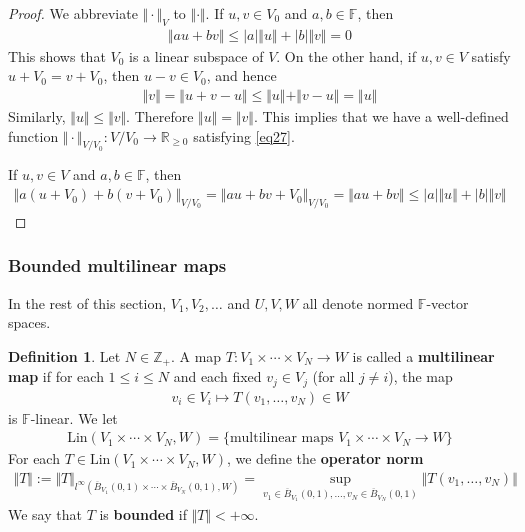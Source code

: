 \documentclass[12pt,b5paper,notitlepage]{article}
\theoremstyle{definition}
\newtheorem{df}{Definition}[section]
\theoremstyle{plain}
\newcommand{\ovl}{\overline}
\newcommand{\Zbb}{\mathbb Z}
\newcommand{\Rbb}{\mathbb R}
\newcommand{\Fbb}{\mathbb F}
\newcommand{\Lin}{\mathrm{Lin}}
\numberwithin{equation}{section}
\begin{document}
\begin{proof}
We abbreviate $\Vert\cdot\Vert_V$ to $\Vert\cdot\Vert$. If $u,v\in V_0$ and $a,b\in\Fbb$, then
\begin{align*}
\Vert au+bv\Vert\leq |a|\Vert u\Vert+|b|\Vert v\Vert=0
\end{align*}
This shows that $V_0$ is a linear subspace of $V$. On the other hand, if $u,v\in V$ satisfy $u+V_0=v+V_0$, then $u-v\in V_0$, and hence
\begin{align*}
\Vert v\Vert=\Vert u+v-u\Vert\leq\Vert u\Vert+\Vert v-u\Vert=\Vert u\Vert
\end{align*}
Similarly, $\Vert u\Vert\leq\Vert v\Vert$. Therefore $\Vert u\Vert=\Vert v\Vert$. This implies that we have a well-defined function $\Vert\cdot\Vert_{V/V_0}:V/V_0\rightarrow\Rbb_{\geq0}$ satisfying \eqref{eq27}.

If $u,v\in V$ and $a,b\in\Fbb$, then
\begin{align*}
\Vert a(u+V_0)+b(v+V_0)\Vert_{V/V_0}=\Vert au+bv+V_0\Vert_{V/V_0}=\Vert au+bv\Vert\leq |a|\Vert u\Vert+|b|\Vert v\Vert
\end{align*}
\end{proof}








\subsubsection{Bounded multilinear maps}

In the rest of this section,  $V_1,V_2,\dots$ and $U,V,W$ all denote normed $\Fbb$-vector spaces.

\begin{df}
Let $N\in\Zbb_+$. A map $T:V_1\times\cdots\times V_N\rightarrow W$ is called a \textbf{multilinear map}  if for each $1\leq i\leq N$ and each fixed $v_j\in V_j$ (for all $j\neq i$), the map
\begin{align*}
v_i\in V_i\mapsto T(v_1,\dots,v_N)\in W
\end{align*}
is $\Fbb$-linear. We let \index{Lin@$\Lin(V_1\times\cdots\times V_N,W)$}
\begin{align*}
\Lin(V_1\times\cdots\times V_N,W)=\{\text{multilinear maps }V_1\times\cdots\times V_N\rightarrow W\}
\end{align*}
For each $T\in \Lin(V_1\times\cdots\times V_N,W)$, we define the \textbf{operator norm}
\begin{align*}
\Vert T\Vert:=\Vert T\Vert_{l^\infty(\ovl B_{V_1}(0,1)\times\cdots\times\ovl B_{V_N}(0,1),W)}=\sup_{v_1\in\ovl B_{V_1}(0,1),\dots,v_N\in\ovl B_{V_N}(0,1)}\Vert T(v_1,\dots,v_N)\Vert
\end{align*}
We say that $T$ is \textbf{bounded}  if $\Vert T\Vert<+\infty$. 
\end{df}
\end{document}
